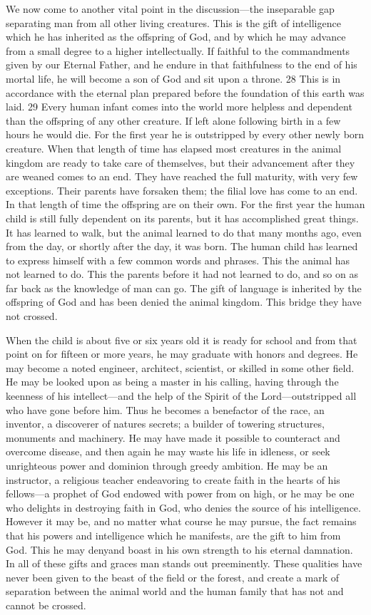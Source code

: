 We now come to another vital point in the discussion—the inseparable gap separating man
from all other living creatures. This is the gift of intelligence which he has inherited as the
offspring of God, and by which he may advance from a small degree to a higher
intellectually. If faithful to the commandments given by our Eternal Father, and he endure in
that faithfulness to the end of his mortal life, he will become a son of God and sit upon a
throne. 28 This is in accordance with the eternal plan prepared before the foundation of this
earth was laid. 29 Every human infant comes into the world more helpless and dependent
than the offspring of any other creature. If left alone following birth in a few hours he would
die. For the first year he is outstripped by every other newly born creature. When that length
of time has elapsed most creatures in the animal kingdom are ready to take care of
themselves, but their advancement after they are weaned comes to an end. They have reached
the full maturity, with very few exceptions. Their parents have forsaken them; the filial love
has come to an end. In that length of time the offspring are on their own. For the first year the
human child is still fully dependent on its parents, but it has accomplished great things. It has
learned to walk, but the animal learned to do that many months ago, even from the day, or
shortly after the day, it was born. The human child has learned to express himself with a few
common words and phrases. This the animal has not learned to do. This the parents before it
had not learned to do, and so on as far back as the knowledge of man can go. The gift of
language is inherited by the offspring of God and has been denied the animal kingdom. This
bridge they have not crossed.

When the child is about five or six years old it is ready for school and from that point on for
fifteen or more years, he may graduate with honors and degrees. He may become a noted
engineer, architect, scientist, or skilled in some other field. He may be looked upon as being a
master in his calling, having through the keenness of his intellect—and the help of the Spirit
of the Lord—outstripped all who have gone before him. Thus he becomes a benefactor of the
race, an inventor, a discoverer of natures secrets; a builder of towering structures, monuments
and machinery. He may have made it possible to counteract and overcome disease, and then
again he may waste his life in idleness, or seek unrighteous power and dominion through
greedy ambition. He may be an instructor, a religious teacher endeavoring to create faith in
the hearts of his fellows—a prophet of God endowed with power from on high, or he may be
one who delights in destroying faith in God, who denies the source of his intelligence.
However it may be, and no matter what course he may pursue, the fact remains that his
powers and intelligence which he manifests, are the gift to him from God. This he may denyand boast in his own strength to his eternal damnation. In all of these gifts and graces man
stands out preeminently. These qualities have never been given to the beast of the field or the
forest, and create a mark of separation between the animal world and the human family that
has not and cannot be crossed.

